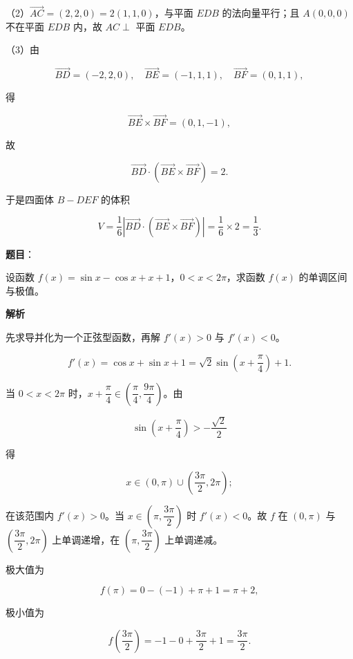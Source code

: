 \begin{answer}
（2）$\overrightarrow{AC}=(2,2,0)=2(1,1,0)$，与平面 $EDB$ 的法向量平行；且 $A(0,0,0)$ 不在平面 $EDB$ 内，故 $AC\perp$ 平面 $EDB$。

（3）由

\nopagebreak[4]
\[\overrightarrow{BD}=(-2,2,0),\quad \overrightarrow{BE}=(-1,1,1),\quad \overrightarrow{BF}=(0,1,1),\]

得

\nopagebreak[4]
\[\overrightarrow{BE}\times\overrightarrow{BF}=(0,1,-1),\]

故

\nopagebreak[4]
\[\overrightarrow{BD}\cdot(\overrightarrow{BE}\times\overrightarrow{BF})=2.\]

于是四面体 $B-DEF$ 的体积

\nopagebreak[4]
\[V=\frac16\left|\overrightarrow{BD}\cdot(\overrightarrow{BE}\times\overrightarrow{BF})\right|=\frac16\times2=\frac13.\]


\end{answer}
\begin{answer}

\textbf{题目}：

设函数 $f(x)=\sin x-\cos x+x+1$，$0<x<2\pi$，求函数 $f(x)$ 的单调区间与极值。

\textbf{解析}

先求导并化为一个正弦型函数，再解 $f'(x)>0$ 与 $f'(x)<0$。

\nopagebreak[4]
\[f'(x)=\cos x+\sin x+1=\sqrt2\sin\left(x+\frac\pi4\right)+1.\]

当 $0<x<2\pi$ 时，$x+\dfrac\pi4\in\left(\dfrac\pi4,\dfrac{9\pi}4\right)$。由

\nopagebreak[4]
\[\sin\left(x+\frac\pi4\right)>-\frac{\sqrt2}2\]

得

\nopagebreak[4]
\[x\in(0,\pi)\cup\left(\frac{3\pi}2,2\pi\right);\]

在该范围内 $f'(x)>0$。当 $x\in\left(\pi,\dfrac{3\pi}2\right)$ 时 $f'(x)<0$。故 $f$ 在 $(0,\pi)$ 与 $\left(\dfrac{3\pi}2,2\pi\right)$ 上单调递增，在 $\left(\pi,\dfrac{3\pi}2\right)$ 上单调递减。

极大值为

\nopagebreak[4]
\[f(\pi)=0-(-1)+\pi+1=\pi+2,\]

极小值为

\nopagebreak[4]
\[f\left(\frac{3\pi}2\right)=-1-0+\frac{3\pi}2+1=\frac{3\pi}2.\]


\end{answer}
